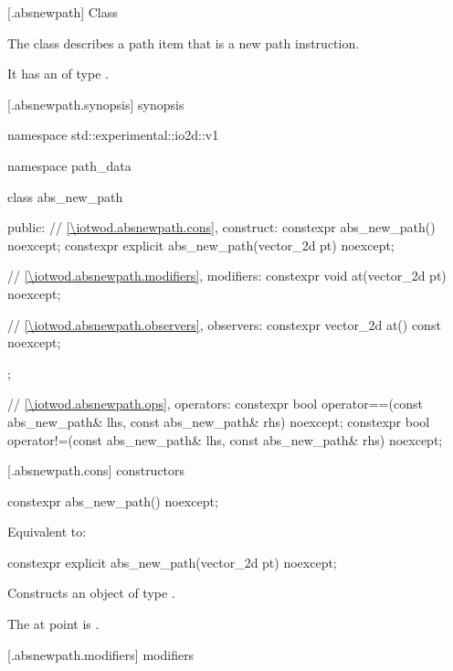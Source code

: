 [\iotwod.absnewpath] {Class }

\pnum
{}%
The class  describes a path item that is a new path instruction.

\pnum
It has an  of type .

 [\iotwod.absnewpath.synopsis] { synopsis}%

\begin{codeblock}
namespace std::experimental::io2d::v1 {
  namespace path_data {
    class abs_new_path {
    public:
      // \ref{\iotwod.absnewpath.cons}, construct:
      constexpr abs_new_path() noexcept;
      constexpr explicit abs_new_path(vector_2d pt) noexcept;

      // \ref{\iotwod.absnewpath.modifiers}, modifiers:
      constexpr void at(vector_2d pt) noexcept;

      // \ref{\iotwod.absnewpath.observers}, observers:
      constexpr vector_2d at() const noexcept;
    };
    
    // \ref{\iotwod.absnewpath.ops}, operators:
    constexpr bool operator==(const abs_new_path& lhs, const abs_new_path& rhs) 
      noexcept;
    constexpr bool operator!=(const abs_new_path& lhs, const abs_new_path& rhs) 
      noexcept;
  }
}
\end{codeblock}

 [\iotwod.absnewpath.cons] { constructors}%

%
\begin{itemdecl}
constexpr abs_new_path() noexcept;
\end{itemdecl}
\begin{itemdescr}
\pnum
\effects
Equivalent to: 
\end{itemdescr}

%
\begin{itemdecl}
constexpr explicit abs_new_path(vector_2d pt) noexcept;
\end{itemdecl}
\begin{itemdescr}
\pnum
\effects
Constructs an object of type .

\pnum
The at point is .
\end{itemdescr}

 [\iotwod.absnewpath.modifiers]{ modifiers}%

